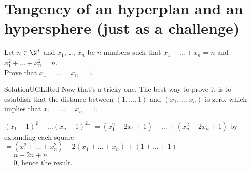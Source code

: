 \documentclass[12pt,a4paper,article,english,firamath]{nsi}
\begin{document}
\section*{Tangency of an hyperplan and an hypersphere \small(just as a challenge)}

Let $n\in\N^*$ and $x_1$, \ldots, $x_n$ be $n$ numbers such that $x_1+\ldots +x_n = n$ and $x_1^2+\ldots +x_n^2 = n$.\\

Prove that $x_1=\ldots=x_n=1$.

\begin{encadrecolore}{Solution}{UGLiRed}
    Now that's a tricky one. The best way to prove it is to establish that the distance between $(1,\ldots,1)$ and $(x_1,...,x_n)$ is zero, which implies that $x_1=\ldots=x_n=1$.\\

    \begin{tabbing}
        $ (x_1-1)^2 + \ldots (x_n-1)^2$ 	\= $= (x_1^2 -2x_1 + 1) + \ldots + (x_n^2-2x_n+1)$ by expanding each square \\
        \> $= (x_1^2+\ldots+x_n^2)-2(x_1+\ldots+x_n)+(1+\ldots+1)$ \\
        \> $= n-2n+n$ \\
        \> $= 0$, hence the result.  
    \end{tabbing}
\end{encadrecolore}
\end{document}
